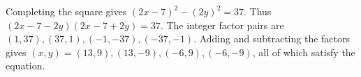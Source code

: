 Completing the square gives $(2x-7)^2-(2y)^2=37$. Thus $(2x-7-2y)(2x-7+2y)=37$. The integer factor pairs are $(1,37),(37,1),(-1,-37),(-37,-1)$. Adding and subtracting the factors gives $\boxed{(x,y)=(13,9),(13,-9),(-6,9),(-6,-9)}$, all of which satisfy the equation.
